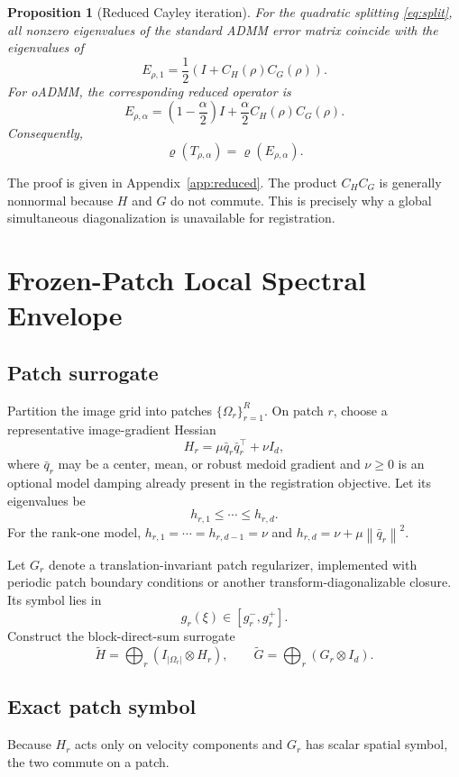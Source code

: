 \documentclass[11pt]{article}
\newtheorem{proposition}[theorem]{Proposition}
\theoremstyle{definition}
\newcommand{\norm}[1]{\left\lVert #1\right\rVert}
\newcommand{\spr}{\varrho}
\begin{document}
\begin{proposition}[Reduced Cayley iteration]\label{prop:reduced}
For the quadratic splitting \eqref{eq:split}, all nonzero eigenvalues of the standard ADMM error matrix coincide with the eigenvalues of
\begin{equation}
E_{\rho,1}=\frac12\left(I+C_H(\rho)C_G(\rho)\right).
\label{eq:Estandard}
\end{equation}
For oADMM, the corresponding reduced operator is
\begin{equation}
E_{\rho,\alpha}
=\left(1-\frac{\alpha}{2}\right)I
+\frac{\alpha}{2}C_H(\rho)C_G(\rho).
\label{eq:Ealpha}
\end{equation}
Consequently,
\[
\spr(T_{\rho,\alpha})=\spr(E_{\rho,\alpha}).
\]
\end{proposition}

The proof is given in Appendix~\ref{app:reduced}. The product $C_HC_G$ is generally nonnormal because $H$ and $G$ do not commute. This is precisely why a global simultaneous diagonalization is unavailable for registration.

\section{Frozen-Patch Local Spectral Envelope}
\subsection{Patch surrogate}
Partition the image grid into patches $\{\Omega_r\}_{r=1}^{R}$. On patch $r$, choose a representative image-gradient Hessian
\begin{equation}
H_r=\mu\bar q_r\bar q_r^\top+\nu I_d,
\label{eq:Hr}
\end{equation}
where $\bar q_r$ may be a center, mean, or robust medoid gradient and $\nu\ge0$ is an optional model damping already present in the registration objective. Let its eigenvalues be
\[
h_{r,1}\le\cdots\le h_{r,d}.
\]
For the rank-one model, $h_{r,1}=\cdots=h_{r,d-1}=\nu$ and $h_{r,d}=\nu+\mu\norm{\bar q_r}^2$.

Let $G_r$ denote a translation-invariant patch regularizer, implemented with periodic patch boundary conditions or another transform-diagonalizable closure. Its symbol lies in
\[
g_r(\xi)\in[g_r^-,g_r^+].
\]
Construct the block-direct-sum surrogate
\[
\widetilde H=\bigoplus_r(I_{|\Omega_r|}\otimes H_r),
\qquad
\widetilde G=\bigoplus_r(G_r\otimes I_d).
\]

\subsection{Exact patch symbol}
Because $H_r$ acts only on velocity components and $G_r$ has scalar spatial symbol, the two commute on a patch.
\end{document}
